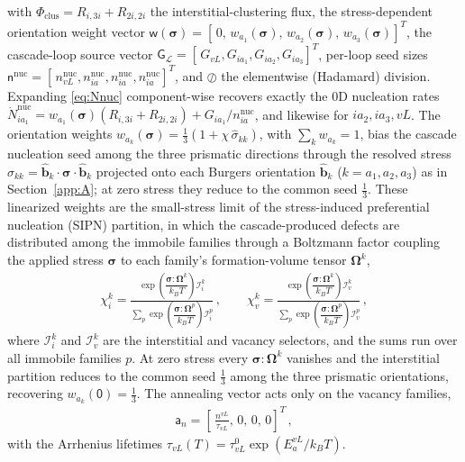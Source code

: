 \documentclass{article}
\newcommand{\spvec}[1]{\bm{\mathsf{#1}}}   %
\begin{document}
with $\Phi_{\mathrm{clus}}=R_{i,3i}+R_{2i,2i}$ the interstitial-clustering flux, the stress-dependent orientation weight vector $\spvec{w}(\bm\sigma)=[\,0,\,w_{a_1}(\bm\sigma),\,w_{a_2}(\bm\sigma),\,w_{a_3}(\bm\sigma)]^T$, the cascade-loop source vector $\spvec{G}_{\mathcal{L}}=[\,G_{vL},G_{ia_1},G_{ia_2},G_{ia_3}]^T$, per-loop seed sizes $\spvec{n}^{\mathrm{nuc}}=[\,n_{vL}^{\mathrm{nuc}},n_{ia}^{\mathrm{nuc}},n_{ia}^{\mathrm{nuc}},n_{ia}^{\mathrm{nuc}}]^T$, and $\oslash$ the elementwise (Hadamard) division. Expanding \eqref{eq:Nnuc} component-wise recovers exactly the $0$D nucleation rates $\dot N_{ia_1}^{\mathrm{nuc}}=w_{a_1}(\bm\sigma)(R_{i,3i}+R_{2i,2i})+G_{ia_1}/n_{ia}^{\mathrm{nuc}}$, and likewise for $ia_2,ia_3,vL$. The orientation weights $w_{a_k}(\bm\sigma)=\tfrac13(1+\chi\,\hat\sigma_{kk})$, with $\sum_k w_{a_k}=1$, bias the cascade nucleation seed among the three prismatic directions through the resolved stress $\sigma_{kk}=\hat{\bm b}_k\cdot\bm\sigma\cdot\hat{\bm b}_k$ projected onto each Burgers orientation $\hat{\bm b}_k$ ($k=a_1,a_2,a_3$) as in Section~\ref{app:A}; at zero stress they reduce to the common seed $\tfrac13$. These linearized weights are the small-stress limit of the stress-induced preferential nucleation (SIPN) partition, in which the cascade-produced defects are distributed among the immobile families through a Boltzmann factor coupling the applied stress $\bm\sigma$ to each family's formation-volume tensor $\bm\Omega^k$,
\begin{align}\label{eq:SIPN}
\chi^k_i=\frac{\exp\left(\dfrac{\bm\sigma:\bm\Omega^k}{k_BT}\right)\mathcal{I}_i^k}{\sum_p\exp\left(\dfrac{\bm\sigma:\bm\Omega^p}{k_BT}\right)\mathcal{I}_i^p}\, ,\qquad \chi^k_v=\frac{\exp\left(\dfrac{\bm\sigma:\bm\Omega^k}{k_BT}\right)\mathcal{I}_v^k}{\sum_p\exp\left(\dfrac{\bm\sigma:\bm\Omega^p}{k_BT}\right)\mathcal{I}_v^p}\, ,
\end{align}
where $\mathcal{I}_i^k$ and $\mathcal{I}_v^k$ are the interstitial and vacancy selectors, and the sums run over all immobile families $p$. At zero stress every $\bm\sigma:\bm\Omega^k$ vanishes and the interstitial partition reduces to the common seed $\tfrac13$ among the three prismatic orientations, recovering $w_{a_k}(\spvec{0})=\tfrac13$. The annealing vector acts only on the vacancy families,
\begin{align}
\spvec{a}_n=\left[\,\frac{n^{vL}}{\tau_{vL}},\,0,\,0,\,0\right]^T\, ,
\end{align}
with the Arrhenius lifetimes $\tau_{vL}(T)=\tau_{vL}^{0}\exp(E_a^{vL}/k_BT)$.
\end{document}
